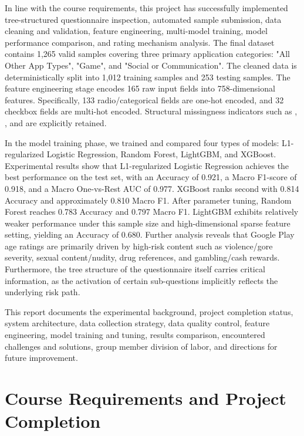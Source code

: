 \documentclass[11pt,a4paper]{article}
\newcommand{\code}[1]{\texttt{\footnotesize\detokenize{#1}}}
\begin{document}
In line with the course requirements, this project has successfully implemented tree-structured questionnaire inspection, automated sample submission, data cleaning and validation, feature engineering, multi-model training, model performance comparison, and rating mechanism analysis. The final dataset contains 1,265 valid samples covering three primary application categories: "All Other App Types", "Game", and "Social or Communication". The cleaned data is deterministically split into 1,012 training samples and 253 testing samples. The feature engineering stage encodes 165 raw input fields into 758-dimensional features. Specifically, 133 radio/categorical fields are one-hot encoded, and 32 checkbox fields are multi-hot encoded. Structural missingness indicators such as \code{__INACTIVE__}, \code{__NOT_APPLICABLE__}, and \code{__NONE__} are explicitly retained.

In the model training phase, we trained and compared four types of models: L1-regularized Logistic Regression, Random Forest, LightGBM, and XGBoost. Experimental results show that L1-regularized Logistic Regression achieves the best performance on the test set, with an Accuracy of 0.921, a Macro F1-score of 0.918, and a Macro One-vs-Rest AUC of 0.977. XGBoost ranks second with 0.814 Accuracy and approximately 0.810 Macro F1. After parameter tuning, Random Forest reaches 0.783 Accuracy and 0.797 Macro F1. LightGBM exhibits relatively weaker performance under this sample size and high-dimensional sparse feature setting, yielding an Accuracy of 0.680. Further analysis reveals that Google Play age ratings are primarily driven by high-risk content such as violence/gore severity, sexual content/nudity, drug references, and gambling/cash rewards. Furthermore, the tree structure of the questionnaire itself carries critical information, as the activation of certain sub-questions implicitly reflects the underlying risk path.

This report documents the experimental background, project completion status, system architecture, data collection strategy, data quality control, feature engineering, model training and tuning, results comparison, encountered challenges and solutions, group member division of labor, and directions for future improvement.

\section{Course Requirements and Project Completion}
\end{document}
